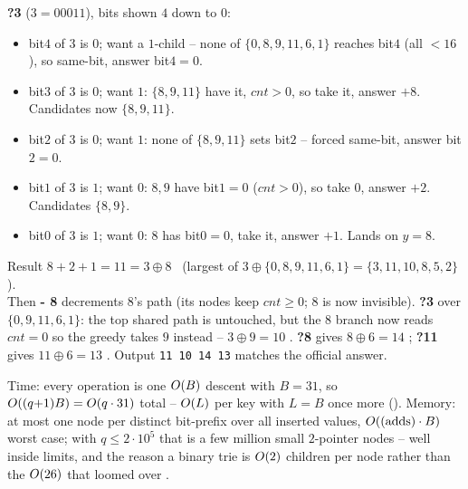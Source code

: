 \begin{tracebox}
\textbf{?3} ($3=00011$), bits shown $4$ down to $0$:
\begin{itemize}[nosep,leftmargin=1.3em]
  \item bit$4$ of $3$ is $0$; want a $1$-child -- none of $\{0,8,9,11,6,1\}$ reaches bit$4$ (all $<16$), so
        same-bit, answer bit$4=0$.
  \item bit$3$ of $3$ is $0$; want $1$: $\{8,9,11\}$ have it, $\mathit{cnt}>0$, so take it, answer
        $+8$. Candidates now $\{8,9,11\}$.
  \item bit$2$ of $3$ is $0$; want $1$: none of $\{8,9,11\}$ sets bit$2$ -- forced same-bit, answer bit$2=0$.
  \item bit$1$ of $3$ is $1$; want $0$: $8,9$ have bit$1=0$ ($\mathit{cnt}>0$), so take $0$, answer $+2$.
        Candidates $\{8,9\}$.
  \item bit$0$ of $3$ is $1$; want $0$: $8$ has bit$0=0$, take it, answer $+1$. Lands on $y=8$.
\end{itemize}
Result $8+2+1 = 11 = 3 \oplus 8$ \checkmark\ (largest of $3\oplus\{0,8,9,11,6,1\}=\{3,11,10,8,5,2\}$).
\smallskip\\
Then \textbf{- 8} decrements $8$'s path (its nodes keep $\mathit{cnt}\ge0$; $8$ is now invisible). \textbf{?3}
over $\{0,9,11,6,1\}$: the top shared path is untouched, but the $8$ branch now reads $\mathit{cnt}=0$ so
the greedy takes $9$ instead -- $3\oplus 9 = 10$ \checkmark. \textbf{?8} gives $8\oplus 6 = 14$ \checkmark;
\textbf{?11} gives $11\oplus 6 = 13$ \checkmark. Output \texttt{11 10 14 13} matches the official answer.
\end{tracebox}

\begin{complexitybox}
Time: every operation is one $O(B)$ descent with $B=31$, so $O((q{+}1)B) = O(q\cdot 31)$ total
-- $O(L)$ per key with $L=B$ once more (). Memory: at most one node per distinct
bit-prefix over all inserted values, $O((\text{adds})\cdot B)$ worst case; with $q\le 2\cdot10^{5}$ that
is a few million small $2$-pointer nodes -- well inside limits, and the reason a binary trie is
$O(2)$ children per node rather than the $O(26)$ that loomed over .
\end{complexitybox}

